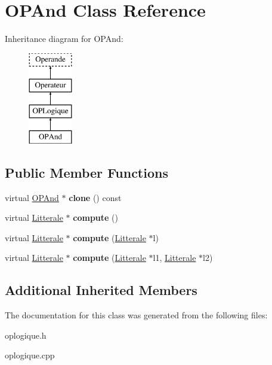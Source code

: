 \hypertarget{class_o_p_and}{}\section{O\+P\+And Class Reference}
\label{class_o_p_and}
Inheritance diagram for O\+P\+And\+:\begin{figure}[H]
\begin{center}
\leavevmode
\includegraphics[height=4.000000cm]{class_o_p_and}
\end{center}
\end{figure}
\subsection*{Public Member Functions}
\begin{DoxyCompactItemize}
\item 
virtual \hyperlink{class_o_p_and}{O\+P\+And} $\ast$ {\bfseries clone} () const \hypertarget{class_o_p_and_ad31a372d9b3b021f64832cfb42c65b64}{}\label{class_o_p_and_ad31a372d9b3b021f64832cfb42c65b64}

\item 
virtual \hyperlink{class_litterale}{Litterale} $\ast$ {\bfseries compute} ()\hypertarget{class_o_p_and_acd2035cca02eead57283ed715e8de918}{}\label{class_o_p_and_acd2035cca02eead57283ed715e8de918}

\item 
virtual \hyperlink{class_litterale}{Litterale} $\ast$ {\bfseries compute} (\hyperlink{class_litterale}{Litterale} $\ast$l)\hypertarget{class_o_p_and_a4ae71086cefdc561d8e67ab7f8e094d9}{}\label{class_o_p_and_a4ae71086cefdc561d8e67ab7f8e094d9}

\item 
virtual \hyperlink{class_litterale}{Litterale} $\ast$ {\bfseries compute} (\hyperlink{class_litterale}{Litterale} $\ast$l1, \hyperlink{class_litterale}{Litterale} $\ast$l2)\hypertarget{class_o_p_and_a5cd30ba5edec5a8264a244507eb239eb}{}\label{class_o_p_and_a5cd30ba5edec5a8264a244507eb239eb}

\end{DoxyCompactItemize}
\subsection*{Additional Inherited Members}


The documentation for this class was generated from the following files\+:\begin{DoxyCompactItemize}
\item 
oplogique.\+h\item 
oplogique.\+cpp\end{DoxyCompactItemize}
